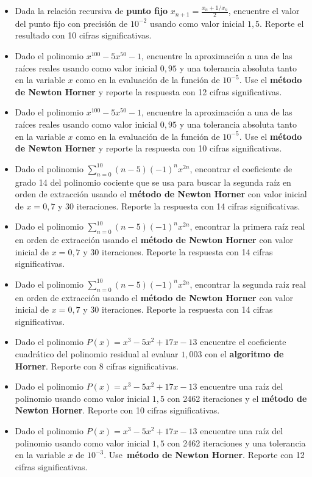 \documentclass[12pt]{article}
\begin{document}
\begin{itemize}
\item Dada la relación recursiva de \textbf{punto fijo} \(x_{n+1} = \frac{x_n + 1/x_n}{2}\), encuentre el valor del punto fijo con precisión de \(10^{-2}\) usando como valor inicial \(1{,}5\). Reporte el resultado con 10 cifras significativas.
\item Dado el polinomio \(x^{100} - 5x^{50} -1\), encuentre la aproximación a una de las raíces reales usando como valor inicial \(0{,}95\) y una tolerancia absoluta tanto en la variable \(x\) como en la evaluación de la función de \(10^{-5}\). Use el \textbf{método de Newton Horner} y reporte la respuesta con 12 cifras significativas.
\item Dado el polinomio \(x^{100} - 5x^{50} -1\), encuentre la aproximación a una de las raíces reales usando como valor inicial \(0{,}95\) y una tolerancia absoluta tanto en la variable \(x\) como en la evaluación de la función de \(10^{-5}\). Use el \textbf{método de Newton Horner} y reporte la respuesta con 10 cifras significativas.
\item Dado el polinomio \(\sum\limits_{n=0}^{10}(n-5)(-1)^n x^{2n}\), encontrar el coeficiente de grado 14 del polinomio cociente que se usa para buscar la segunda raíz en orden de extracción  usando el \textbf{método de Newton Horner} con valor inicial de \(x=0{,}7\) y 30 iteraciones. Reporte la respuesta con 14 cifras significativas.
\item Dado el polinomio \(\sum\limits_{n=0}^{10}(n-5)(-1)^n x^{2n}\), encontrar la primera raíz real en orden de extracción usando el \textbf{método de Newton Horner} con valor inicial de \(x=0{,}7\) y 30 iteraciones. Reporte la respuesta con 14 cifras significativas.
\item Dado el polinomio \(\sum\limits_{n=0}^{10}(n-5)(-1)^n x^{2n}\), encontrar la segunda raíz real en orden de extracción usando el \textbf{método de Newton Horner} con valor inicial de \(x=0{,}7\) y 30 iteraciones. Reporte la respuesta con 14 cifras significativas.
\item Dado el polinomio \(P(x) = x^3 - 5x^2 + 17x -13\) encuentre el coeficiente cuadrático del polinomio residual al evaluar \(1{,}003\) con el \textbf{algoritmo de Horner}. Reporte con 8 cifras significativas.
\item Dado el polinomio \(P(x) = x^3 - 5x^2 + 17x -13\) encuentre una raíz del polinomio usando como valor inicial \(1{,}5\) con 2462 iteraciones y el \textbf{método de Newton Horner}. Reporte con 10 cifras significativas.
\item Dado el polinomio \(P(x) = x^3 - 5x^2 + 17x -13\) encuentre una raíz del polinomio usando como valor inicial \(1{,}5\) con 2462 iteraciones y una tolerancia en la variable \(x\) de \(10^{-3}\). Use \textbf{método de Newton Horner}. Reporte con 12 cifras significativas.

\end{itemize}
\end{document}
